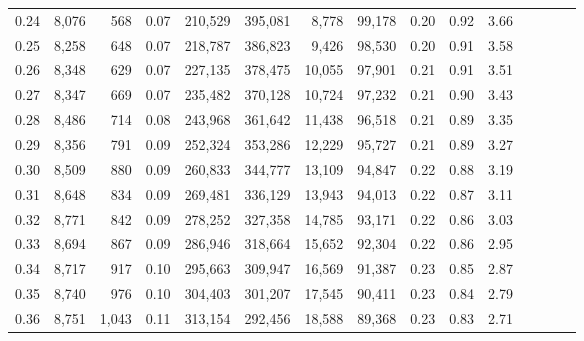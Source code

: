 \begin{tabular}{rrrcrrrrrrrrrrr}
0.24 &   8,076 &     568 &                                       0.07 &  210,529 &  395,081 &    8,778 &   99,178 &  0.20 &  0.92 &                         3.66 \\
0.25 &   8,258 &     648 &                                       0.07 &  218,787 &  386,823 &    9,426 &   98,530 &  0.20 &  0.91 &                         3.58 \\
0.26 &   8,348 &     629 &                                       0.07 &  227,135 &  378,475 &   10,055 &   97,901 &  0.21 &  0.91 &                         3.51 \\
0.27 &   8,347 &     669 &                                       0.07 &  235,482 &  370,128 &   10,724 &   97,232 &  0.21 &  0.90 &                         3.43 \\
0.28 &   8,486 &     714 &                                       0.08 &  243,968 &  361,642 &   11,438 &   96,518 &  0.21 &  0.89 &                         3.35 \\
0.29 &   8,356 &     791 &                                       0.09 &  252,324 &  353,286 &   12,229 &   95,727 &  0.21 &  0.89 &                         3.27 \\
0.30 &   8,509 &     880 &                                       0.09 &  260,833 &  344,777 &   13,109 &   94,847 &  0.22 &  0.88 &                         3.19 \\
0.31 &   8,648 &     834 &                                       0.09 &  269,481 &  336,129 &   13,943 &   94,013 &  0.22 &  0.87 &                         3.11 \\
0.32 &   8,771 &     842 &                                       0.09 &  278,252 &  327,358 &   14,785 &   93,171 &  0.22 &  0.86 &                         3.03 \\
0.33 &   8,694 &     867 &                                       0.09 &  286,946 &  318,664 &   15,652 &   92,304 &  0.22 &  0.86 &                         2.95 \\
0.34 &   8,717 &     917 &                                       0.10 &  295,663 &  309,947 &   16,569 &   91,387 &  0.23 &  0.85 &                         2.87 \\
0.35 &   8,740 &     976 &                                       0.10 &  304,403 &  301,207 &   17,545 &   90,411 &  0.23 &  0.84 &                         2.79 \\
0.36 &   8,751 &   1,043 &                                       0.11 &  313,154 &  292,456 &   18,588 &   89,368 &  0.23 &  0.83 &                         2.71 \\

\end{tabular}
